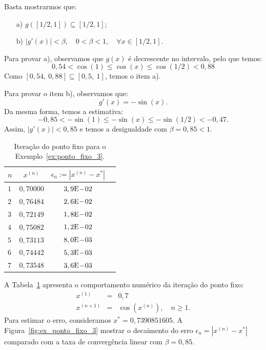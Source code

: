 \begin{sol}
  Basta mostrarmos que:
  \begin{enumerate}
  \item[a)] $g\left([1/2,1]\right) \subseteq [1/2,1]$;
  \item[b)] $|g'(x)|<\beta, \quad 0<\beta<1,\quad \forall x\in [1/2,1]$.
  \end{enumerate}

Para provar a), observamos que $g(x)$ é decrescente no intervalo, pelo que temos:
\begin{equation}
  0,54<\cos(1)\leq \cos(x)\leq \cos(1/2)<0,88
\end{equation}
Como $[0,54,~0,88]\subseteq [0,5,~1]$, temos o item a).

Para provar o item b), observamos que:
\begin{equation}
  g'(x) = -\sin(x).
\end{equation}
Da mesma forma, temos a estimativa:
\begin{equation}
  -0,85<-\sin(1) \leq -\sin(x)\leq -\sin(1/2)<-0,47.
\end{equation}
Assim, $|g'(x)|<0,85$ e temos a desigualdade com $\beta=0,85<1$.

\begin{table}
  \centering
  \begin{tabular}{l|ccc}\hline
   $n$ & $x^{(n)}$ & $\epsilon_n := |x^{(n)} - x^*|$ \\\hline
   $1$ & $0,70000$ & $3,9\mathrm{E}\!-\!02$ \\
   $2$ & $0,76484$ & $2,6\mathrm{E}\!-\!02$ \\
   $3$ & $0,72149$ & $1,8\mathrm{E}\!-\!02$ \\
   $4$ & $0,75082$ & $1,2\mathrm{E}\!-\!02$ \\
   $5$ & $0,73113$ & $8,0\mathrm{E}\!-\!03$ \\
   $6$ & $0,74442$ & $5,3\mathrm{E}\!-\!03$ \\
   $7$ & $0,73548$ & $3,6\mathrm{E}\!-\!03$ \\\hline
  \end{tabular}
  \caption{Iteração do ponto fixo para o Exemplo~\ref{ex:ponto_fixo_3}.}
  \label{tab:ponto_fixo_3}
\end{table}


A Tabela~\ref{tab:ponto_fixo_3} apresenta o comportamento numérico da iteração do ponto fixo:
\begin{eqnarray}
x^{(1)} &=& 0,7\\
x^{(n+1)} &=& \cos(x^{(n)}),\quad n\geq 1.
\end{eqnarray}
Para estimar o erro, consideramos $x^* = 0,7390851605$. A Figura~\ref{fig:ex_ponto_fixo_3} mostrar o decaimento do erro $\epsilon_n = |x^{(n)} - x^*|$ comparado com a taxa de convergência linear com $\beta = 0,85$.


\end{sol}
